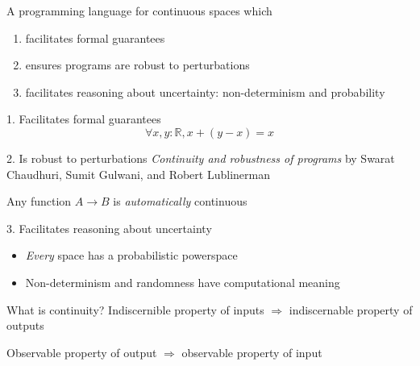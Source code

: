 \documentclass[14pt, notes]{beamer}
\newcommand{\R}{\mathbb{R}}
\begin{document}
\begin{frame}
A programming language for continuous spaces which
\begin{enumerate}
\item facilitates formal guarantees
\item ensures programs are robust to perturbations
\item facilitates reasoning about uncertainty: non-determinism and probability
\end{enumerate}
\end{frame}

\begin{frame}{1. Facilitates formal guarantees}
\[
\forall x, y : \R, x + (y - x) = x
\]
\end{frame}

\begin{frame}{2. Is robust to perturbations}
\emph{Continuity and robustness of programs} by Swarat Chaudhuri, Sumit Gulwani, and Robert Lublinerman

Any function $A \to B$ is \emph{automatically} continuous
\end{frame}

\begin{frame}{3. Facilitates reasoning about uncertainty}
\begin{itemize}
\item \emph{Every} space has a probabilistic powerspace
\item Non-determinism and randomness have computational meaning
\end{itemize}
\end{frame}

\begin{frame}{What is continuity?}
Indiscernible property of inputs $\Rightarrow$ indiscernable property of outputs

Observable property of output $\Rightarrow$ observable property of input
\end{frame}

\end{document}
